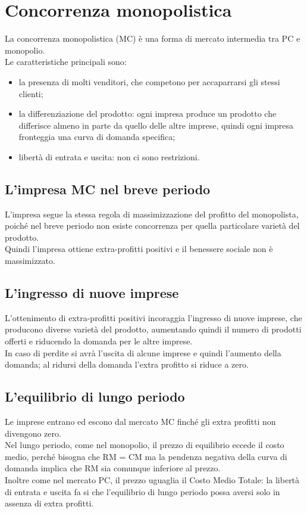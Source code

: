 \documentclass{report}
\begin{document}
	\section{Concorrenza monopolistica}
	La concorrenza monopolistica (MC) è una forma di mercato intermedia tra PC e monopolio.
	\medskip \\Le caratteristiche principali sono:
	\begin{itemize}
		\item la presenza di molti venditori, che competono per accaparrarsi gli stessi clienti;
		\item la differenziazione del prodotto: ogni impresa produce un prodotto che differisce almeno in parte da quello delle altre imprese, quindi ogni impresa fronteggia una curva di domanda specifica;
		\item libertà di entrata e uscita: non ci sono restrizioni.
	\end{itemize}
	\subsection{L'impresa MC nel breve periodo}
	L'impresa segue la stessa regola di massimizzazione del profitto del monopolista, poiché nel breve periodo non esiste concorrenza per quella particolare varietà del prodotto.
	\medskip \\Quindi l'impresa ottiene extra-profitti positivi e il benessere sociale non è massimizzato.
	\subsection{L'ingresso di nuove imprese}
	L'ottenimento di extra-profitti positivi incoraggia l'ingresso di nuove imprese, che producono diverse varietà del prodotto, aumentando quindi il numero di prodotti offerti e riducendo la domanda per le altre imprese.\medskip \\In caso di perdite si avrà l'uscita di alcune imprese e quindi l'aumento della domanda; al ridursi della domanda l'extra profitto si riduce a zero.
	\subsection{L'equilibrio di lungo periodo}
	Le imprese entrano ed escono dal mercato MC finché gli extra profitti non divengono zero.\medskip \\
	Nel lungo periodo, come nel monopolio, il prezzo di equilibrio eccede il costo medio, perché bisogna che RM = CM ma la pendenza negativa della curva di domanda implica che RM sia comunque inferiore al prezzo.\medskip \\Inoltre come nel mercato PC, il prezzo uguaglia il Costo Medio Totale: la libertà di entrata e uscita fa si che l'equilibrio di lungo periodo possa aversi solo in assenza di extra profitti.
\end{document}
